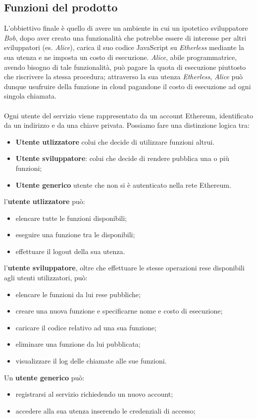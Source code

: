 \subsection{Funzioni del prodotto}
L'obbiettivo finale è quello di avere un ambiente in cui un ipotetico sviluppatore \textit{Bob}, dopo aver creato una funzionalità che potrebbe essere di interesse per altri sviluppatori (es. \textit{Alice}), carica il suo codice JavaScript su \textit{Etherless} mediante la sua utenza e ne imposta un costo di esecuzione. \textit{Alice}, abile programmatrice, avendo bisogno di tale funzionalità, può pagare la quota di esecuzione piuttosto che riscrivere la stessa procedura; attraverso la sua utenza \textit{Etherless}, \textit{Alice} può dunque usufruire della funzione in cloud pagandone il costo di esecuzione ad ogni singola chiamata.
\\\\
Ogni utente del servizio viene rappresentato da un account Ethereum\glo, identificato da un indirizzo e da una chiave privata. Possiamo fare una distinzione logica tra:
\begin{itemize}
	\item \textbf{Utente utlizzatore} colui che decide di utilizzare funzioni altrui.
	\item \textbf{Utente sviluppatore}: colui che decide di rendere pubblica una o più funzioni;
	\item \textbf{Utente generico} utente che non si è autenticato nella rete Ethereum\glo.
\end{itemize} 
l'\textbf{utente utlizzatore} può:
\begin{itemize}
	\item elencare tutte le funzioni disponibili;
	\item eseguire una funzione tra le disponibili;
	\item effettuare il logout della sua utenza.
\end{itemize}
l'\textbf{utente sviluppatore}, oltre che effettuare le stesse operazioni rese disponibili agli utenti utilizzatori, può:
\begin{itemize}
	\item elencare le funzioni da lui rese pubbliche;
	\item creare una nuova funzione e specificarne nome e costo di esecuzione;
	\item caricare il codice relativo ad una sua funzione;
	\item eliminare una funzione da lui pubblicata;
	\item visualizzare il log delle chiamate alle sue funzioni.
\end{itemize}
Un \textbf{utente generico} può:
\begin{itemize}
	\item registrarsi al servizio richiedendo un nuovo account;
	\item accedere alla sua utenza inserendo le credenziali di accesso;
\end{itemize}


